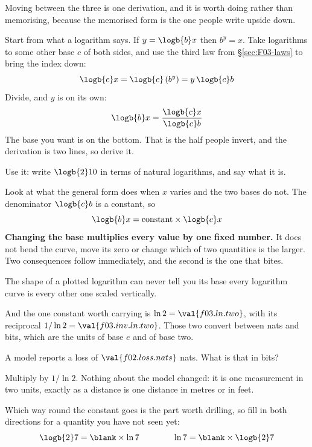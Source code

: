 \begin{fr}
Moving between the three is one derivation, and it is worth doing rather than
memorising, because the memorised form is the one people write upside down.

Start from what a logarithm says. If $y = \logb{b} x$ then $b^{y} = x$. Take
logarithms to some other base $c$ of both sides, and use the third law from
\S\ref{sec:F03-laws} to bring the index down:
\[ \logb{c} x = \logb{c} \left(b^{y}\right) = y \, \logb{c} b \]
Divide, and $y$ is on its own:
\[ \logb{b} x = \frac{\logb{c} x}{\logb{c} b} \]
The base you want is on the bottom. That is the half people invert, and the
derivation is two lines, so derive it.

Use it: write $\logb{2} 10$ in terms of natural logarithms, and say what it is.
\nextframe
\end{fr}

\begin{fr}
Look at what the general form does when $x$ varies and the two bases do not.
The denominator $\logb{c} b$ is a constant, so
\[ \logb{b} x = \text{constant} \times \logb{c} x \]
\textbf{Changing the base multiplies every value by one fixed number.} It does
not bend the curve, move its zero or change which of two quantities is the
larger. Two consequences follow immediately, and the second is the one that
bites.

The shape of a plotted logarithm can never tell you its base \dash{} every
logarithm curve is every other one scaled vertically.

And the one constant worth carrying is $\ln 2 = \val{f03.ln.two}$, with its
reciprocal $1 / \ln 2 = \val{f03.inv.ln.two}$. Those two convert between nats
and bits, which are the units of base $e$ and of base two.

A model reports a loss of $\val{f02.loss.nats}$ nats. What is that in bits?
\nextframe
\end{fr}

\begin{fr}
Multiply by $1/\ln 2$. Nothing about the model changed: it is one measurement
in two units, exactly as a distance is one distance in metres or in feet.

Which way round the constant goes is the part worth drilling, so fill in both
directions for a quantity you have not seen yet:
\[ \logb{2} 7 = \blank \times \ln 7 \qquad\qquad
   \ln 7 = \blank \times \logb{2} 7 \]
\dotline
\nextframe
\end{fr}

